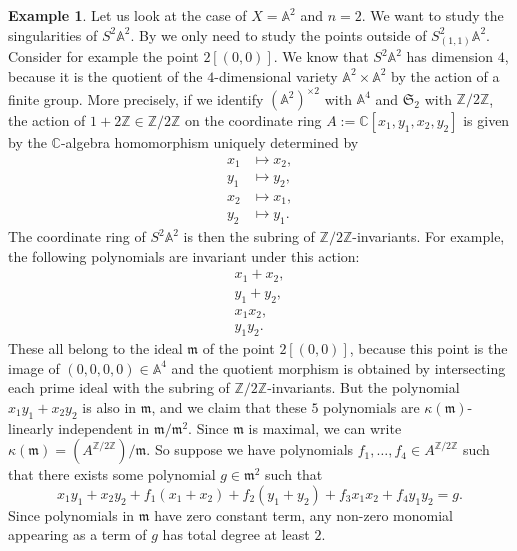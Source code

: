 \documentclass[12pt,a4paper]{amsart}
\theoremstyle{plain}
\theoremstyle{definition}
\newtheorem{exmp}[thm]{Example}
\theoremstyle{remark}
\begin{document}
\begin{exmp}
  Let us look at the case of $X = \mathbb{A}^{2}$ and $n = 2$.
  We want to study the singularities of $S^{2}\mathbb{A}^{2}$.
  By  we only need to study the points outside of $S^{2}_{(1,1)}\mathbb{A}^{2}$.
  Consider for example the point $2[(0,0)]$.
  We know that $S^{2}\mathbb{A}^{2}$ has dimension $4$, because it is the quotient of the $4$-dimensional variety $\mathbb{A}^{2} \times \mathbb{A}^{2}$ by the action of a finite group.
  More precisely, if we identify $(\mathbb{A}^{2})^{\times 2}$ with $\mathbb{A}^{4}$ and $\mathfrak{S}_{2}$ with $\mathbb{Z}/2\mathbb{Z}$, the action of $1 + 2\mathbb{Z} \in \mathbb{Z}/2\mathbb{Z}$ on the coordinate ring $A := \mathbb{C}[x_{1}, y_{1}, x_{2}, y_{2}]$ is given by the $\mathbb{C}$-algebra homomorphism uniquely determined by
  \begin{align*}
    x_{1} & \mapsto x_{2}, \\
    y_{1} & \mapsto y_{2}, \\
    x_{2} & \mapsto x_{1}, \\
    y_{2} & \mapsto y_{1}.
  \end{align*}
  The coordinate ring of $S^{2}\mathbb{A}^{2}$ is then the subring of $\mathbb{Z}/2\mathbb{Z}$-invariants.
  For example, the following polynomials are invariant under this action:
  \begin{align*}
    x_{1} + x_{2}, \\
    y_{1} + y_{2}, \\
    x_{1}x_{2}, \\
    y_{1}y_{2}.
  \end{align*}
  These all belong to the ideal $\mathfrak{m}$ of the point $2[(0,0)]$, because this point is the image of $(0,0,0,0) \in \mathbb{A}^{4}$ and the quotient morphism is obtained by intersecting each prime ideal with the subring of $\mathbb{Z}/2\mathbb{Z}$-invariants.
  But the polynomial $x_{1}y_{1} + x_{2}y_{2}$ is also in $\mathfrak{m}$, and we claim that these $5$ polynomials are $\kappa(\mathfrak{m})$-linearly independent in $\mathfrak{m}/\mathfrak{m}^{2}$.
  Since $\mathfrak{m}$ is maximal, we can write $\kappa(\mathfrak{m}) = (A^{\mathbb{Z}/2\mathbb{Z}})/\mathfrak{m}$.
  So suppose we have polynomials $f_{1}, \ldots, f_{4} \in A^{\mathbb{Z}/2\mathbb{Z}}$ such that there exists some polynomial $g \in \mathfrak{m}^{2}$ such that
  \[ x_{1}y_{1} + x_{2}y_{2} + f_{1}(x_{1} + x_{2}) + f_{2}(y_{1} + y_{2}) + f_{3}x_{1}x_{2} + f_{4}y_{1}y_{2} = g. \]
  Since polynomials in $\mathfrak{m}$ have zero constant term, any non-zero monomial appearing as a term of $g$ has total degree at least $2$.

\end{exmp}
\end{document}
